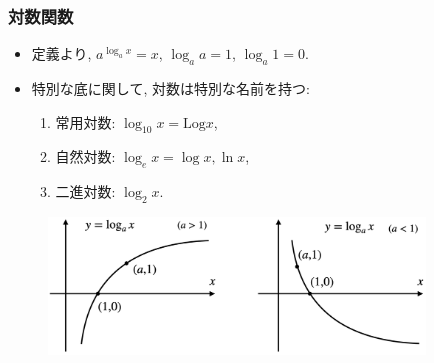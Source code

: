 

\begin{frame}
\frametitle{対数関数}   

\begin{itemize}
\item 定義より, $a^{\log_a x}=x$, $\log_a a=1$, $\log_a 1=0$. 
\item 特別な底に関して, 対数は特別な名前を持つ: 
\begin{enumerate}
\item 常用対数: $\log_{10} x=\mathrm{Log} x$, 
\item 自然対数: $\log_e x=\log x, \ln x$, 
\item 二進対数: $\log_2 x$.  
\end{enumerate}
\end{itemize}

\vspace{-1mm}

\begin{figure}[htbp]
 \begin{center} 
  \includegraphics[width=100mm]{calculus2/log.png}
 \end{center}
\end{figure}
\vspace{-4mm}

\end{frame}





